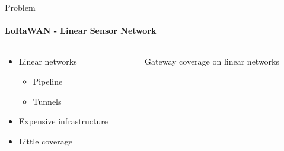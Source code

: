 \begin{frame}{Problem}
\framesubtitle{LoRaWAN - Linear Sensor Network}
\begin{columns}
\begin{column}{0.4\textwidth}
\begin{itemize}
    \item Linear networks
    \begin{itemize}
        \item Pipeline
        \item Tunnels
    \end{itemize}
    \item Expensive infrastructure
    \item Little coverage
\end{itemize}
\end{column}
\begin{column}{0.6\textwidth}

\begin{figure}[H]
    \centering
    \caption{Gateway coverage on linear networks\label{fig:lsn}}
\end{figure}

\end{column}
\end{columns}
\end{frame}


